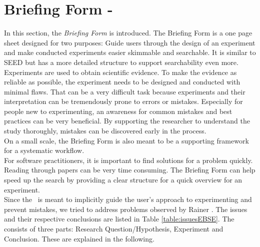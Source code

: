 
\section{Briefing Form - \briefingform}
\label{sec:briefing form}

In this section, the \textit{Briefing Form} is introduced. The Briefing Form is a one page sheet designed for two purposes: Guide users through the design of an experiment and make conducted experiments easier skimmable and searchable. It is similar to SEED but has a more detailed structure to support searchability even more.\\
Experiments are used to obtain scientific evidence. To make the evidence as reliable as possible, the experiment needs to be designed and conducted with minimal flaws. That can be a very difficult task because experiments and their interpretation can be tremendously prone to errors or mistakes. Especially for people new to experimenting, an awareness for common mistakes and best practices can be very beneficial. By supporting the researcher to understand the study thoroughly, mistakes can be discovered early in the process.\\
On a small scale, the Briefing Form is also meant to be a  supporting framework for a systematic workflow.\\
For software practitioners, it is important to find solutions for a problem quickly. Reading through papers can be very time consuming. The Briefing Form can help speed up the search by providing a clear structure for a quick overview for an experiment.\\
Since the \briefingform~is meant to implicitly guide the user's approach to experimenting and prevent mistakes, we tried to address problems observed  by Rainer \etal \cite{Rainer2006}. The issues and their respective conclusions are listed in Table \ref{table:issuesEBSE}. The \briefingform consists of three parts: Research Question/Hypothesis, Experiment and Conclusion. These are explained in the following.\\

